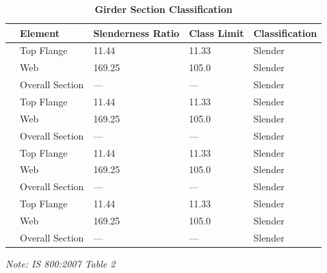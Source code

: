 \documentclass[12pt,a4paper]{report}
\numberwithin{table}{chapter}
\numberwithin{figure}{chapter}
\begin{document}
\vspace{1em}
\begin{longtable}{|C{2.5cm}|L{3cm}|C{3.5cm}|C{2.5cm}|>{\centering\arraybackslash}p{4.0cm}|}
\caption{\textbf{Girder Section Classification}}
\hline
\textbf{} & \textbf{Element} & \textbf{Slenderness Ratio} & \textbf{Class Limit} & \textbf{Classification} \\[6pt]
\hline
{} & Top Flange & 11.44 & 11.33 & Slender \\[6pt]
 & Web & 169.25 & 105.0 & Slender \\[6pt]
 & Overall Section & --- & --- & Slender \\[6pt]
\hline
{} & Top Flange & 11.44 & 11.33 & Slender \\[6pt]
 & Web & 169.25 & 105.0 & Slender \\[6pt]
 & Overall Section & --- & --- & Slender \\[6pt]
\hline
{} & Top Flange & 11.44 & 11.33 & Slender \\[6pt]
 & Web & 169.25 & 105.0 & Slender \\[6pt]
 & Overall Section & --- & --- & Slender \\[6pt]
\hline
{} & Top Flange & 11.44 & 11.33 & Slender \\[6pt]
 & Web & 169.25 & 105.0 & Slender \\[6pt]
 & Overall Section & --- & --- & Slender \\[6pt]
\hline
\end{longtable}
\noindent\textit{Note: IS 800:2007 Table 2}
\end{document}
